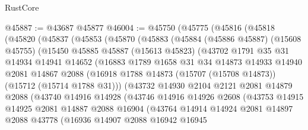 \begin{lexlean}{RustCore}
\begin{coremodule}
@45887 := @43687 @45877
@46004 := @45750
    (@45775
      (@45816
        (@45818
          (@45820
            (@45837
              (@45853
                (@45870
                  (@45883
                    (@45884
                      (@45886 @45887)
                      (@15608 @45755)
                      (@15450
                        @45885
                        @45887
                        (@15613 @45823)
                        (@43702
                          @1791
                          @35
                          @31
                          @14934
                          @14941
                          @14652
                          (@16883
                            @1789
                            @1658
                            @31
                            @34
                            @14873
                            @14933
                            @14940
                            @2081
                            @14867
                            @2088
                            (@16918
                              @1788
                              @14873
                              (@15707 (@15708 @14873))
                              (@15712 (@15714 @1788 @31)))
                            (@43732
                              @14930
                              @2104
                              @2121
                              @2081
                              @14879
                              @2088
                              (@43740
                                @14916
                                @14928
                                (@43746
                                  @14916
                                  @14926
                                  @2608
                                  (@43753
                                    @14915
                                    @14925
                                    @2081
                                    @14887
                                    @2088
                                    @16904
                                    (@43764
                                      @14914
                                      @14924
                                      @2081
                                      @14897
                                      @2088
                                      @43778
                                      (@16936
                                        @14907
                                        @2088
                                        @16942
                                        @16945

\end{coremodule}
\end{lexlean}
